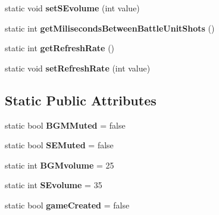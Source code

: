 \begin{DoxyCompactItemize}
\item 
static void {\bfseries set\+S\+Evolume} (int value)\hypertarget{class_game_settings_a44db62397d2b3439492c0aea84a16c32}{}\label{class_game_settings_a44db62397d2b3439492c0aea84a16c32}

\item 
static int {\bfseries get\+Miliseconds\+Between\+Battle\+Unit\+Shots} ()\hypertarget{class_game_settings_ac915c3001cebddf35be247d5624b6dce}{}\label{class_game_settings_ac915c3001cebddf35be247d5624b6dce}

\item 
static int {\bfseries get\+Refresh\+Rate} ()\hypertarget{class_game_settings_abd529075573e6b9407809126a5b88a0a}{}\label{class_game_settings_abd529075573e6b9407809126a5b88a0a}

\item 
static void {\bfseries set\+Refresh\+Rate} (int value)\hypertarget{class_game_settings_aba05d696b69194f775d0cf5f46304f09}{}\label{class_game_settings_aba05d696b69194f775d0cf5f46304f09}

\end{DoxyCompactItemize}
\subsection*{Static Public Attributes}
\begin{DoxyCompactItemize}
\item 
static bool {\bfseries B\+G\+M\+Muted} = false\hypertarget{class_game_settings_a87e3bb0896d1bb44e7797df275b1f1ab}{}\label{class_game_settings_a87e3bb0896d1bb44e7797df275b1f1ab}

\item 
static bool {\bfseries S\+E\+Muted} = false\hypertarget{class_game_settings_a6945f286363960c2331bbcb4ec758e43}{}\label{class_game_settings_a6945f286363960c2331bbcb4ec758e43}

\item 
static int {\bfseries B\+G\+Mvolume} = 25\hypertarget{class_game_settings_a5fc95f4ae14129aec1b0bd02996c22df}{}\label{class_game_settings_a5fc95f4ae14129aec1b0bd02996c22df}

\item 
static int {\bfseries S\+Evolume} = 35\hypertarget{class_game_settings_a4077fc804506698a19d5f1c4878c95ff}{}\label{class_game_settings_a4077fc804506698a19d5f1c4878c95ff}

\item 
static bool {\bfseries game\+Created} = false\hypertarget{class_game_settings_a8e4eaa1eef1419e3d25660d57ee51b7c}{}\label{class_game_settings_a8e4eaa1eef1419e3d25660d57ee51b7c}

\end{DoxyCompactItemize}


